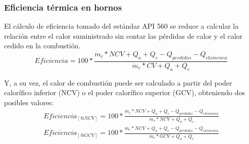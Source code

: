 \subsubsection{Eficiencia térmica en hornos}
\par El cálculo de eficiencia tomado del estándar API 560 \cite{bib:api560} se reduce a calcular la relación entre el calor suministrado sin contar las pérdidas de calor y el calor cedido en la combustión.
\begin{equation}
Eficiencia = 100 *\frac{\dot m_c*NCV +Q_a +Q_c -Q_{perdidas} -Q_{chimenea}
}{\dot m_c*CV +Q_a +Q_c}
\end{equation}
\par Y, a su vez, el calor de combustión puede ser calculado a partir del poder calorífico inferior (NCV) o el poder calorífico superior (GCV), obteniendo dos posibles valores:
\begin{gather}
Eficiencia_{[@NCV]} = 100 *\frac{\dot m_c*NCV +Q_a +Q_c -Q_{perdidas}-Q_{chimenea}
}{\dot m_c*NCV +Q_a +Q_c}\\
Eficiencia_{[@GCV]} = 100 *\frac{\dot m_c*NCV +Q_a +Q_c -Q_{perdidas} -Q_{chimenea}
}{\dot m_c*GCV +Q_a +Q_c}
\end{gather}